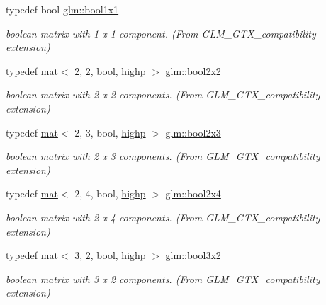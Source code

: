\begin{DoxyCompactItemize}
typedef bool \hyperlink{group__gtx__compatibility_ga98d9d3da22aebc872ba38ce5afa0eff7}{glm\+::bool1x1}
\begin{DoxyCompactList}\small\item\em boolean matrix with 1 x 1 component. (From G\+L\+M\+\_\+\+G\+T\+X\+\_\+compatibility extension) \end{DoxyCompactList}\item 
typedef \hyperlink{structglm_1_1mat}{mat}$<$ 2, 2, bool, \hyperlink{namespaceglm_a36ed105b07c7746804d7fdc7cc90ff25ac6f7eab42eacbb10d59a58e95e362074}{highp} $>$ \hyperlink{group__gtx__compatibility_ga1a3707855138ba2d14b7f2ccfb93f476}{glm\+::bool2x2}
\begin{DoxyCompactList}\small\item\em boolean matrix with 2 x 2 components. (From G\+L\+M\+\_\+\+G\+T\+X\+\_\+compatibility extension) \end{DoxyCompactList}\item 
typedef \hyperlink{structglm_1_1mat}{mat}$<$ 2, 3, bool, \hyperlink{namespaceglm_a36ed105b07c7746804d7fdc7cc90ff25ac6f7eab42eacbb10d59a58e95e362074}{highp} $>$ \hyperlink{group__gtx__compatibility_gabbcc655d12f2f13ddc1917414389e8e1}{glm\+::bool2x3}
\begin{DoxyCompactList}\small\item\em boolean matrix with 2 x 3 components. (From G\+L\+M\+\_\+\+G\+T\+X\+\_\+compatibility extension) \end{DoxyCompactList}\item 
typedef \hyperlink{structglm_1_1mat}{mat}$<$ 2, 4, bool, \hyperlink{namespaceglm_a36ed105b07c7746804d7fdc7cc90ff25ac6f7eab42eacbb10d59a58e95e362074}{highp} $>$ \hyperlink{group__gtx__compatibility_gaa709e6df01dc0ae495c0b5c901a0a181}{glm\+::bool2x4}
\begin{DoxyCompactList}\small\item\em boolean matrix with 2 x 4 components. (From G\+L\+M\+\_\+\+G\+T\+X\+\_\+compatibility extension) \end{DoxyCompactList}\item 
typedef \hyperlink{structglm_1_1mat}{mat}$<$ 3, 2, bool, \hyperlink{namespaceglm_a36ed105b07c7746804d7fdc7cc90ff25ac6f7eab42eacbb10d59a58e95e362074}{highp} $>$ \hyperlink{group__gtx__compatibility_ga24674530ea1f5c4e78ba3932dcd7504a}{glm\+::bool3x2}
\begin{DoxyCompactList}\small\item\em boolean matrix with 3 x 2 components. (From G\+L\+M\+\_\+\+G\+T\+X\+\_\+compatibility extension) \end{DoxyCompactList}\item 

\end{DoxyCompactItemize}
